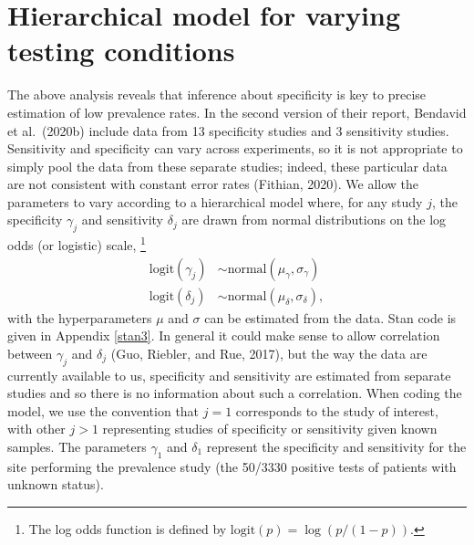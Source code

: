 \documentclass[11pt]{article}
\begin{document}
\section{Hierarchical model for varying testing conditions}\label{model2}

The above analysis reveals that inference about specificity is key to
precise estimation of low prevalence rates.  In the second version of
their report, Bendavid et al.\ (2020b) include data from 13
specificity studies and 3 sensitivity studies.  Sensitivity and
specificity can vary across experiments, so it is not appropriate to
simply pool the data from these separate studies; indeed, these
particular data are not consistent with constant error rates (Fithian,
2020). We allow the parameters to vary according to a hierarchical
model where, for any study $j$, the specificity $\gamma_j$ and
sensitivity $\delta_j$ are drawn from normal distributions on the
log odds (or logistic) scale,%
%
\footnote{The log odds function is defined by $\textrm{logit}(p) = \log(p / (1 - p)).$}
%
\begin{align*}
  \mbox{logit}(\gamma_j) & \sim \mbox{normal}(\mu_{\gamma}, \sigma_{\gamma})\\
 \mbox{logit}(\delta_j) & \sim \mbox{normal}(\mu_{\delta}, \sigma_{\delta}),
\end{align*}
%
with the hyperparameters $\mu$ and $\sigma$ can be estimated from the
data.  Stan code is given in Appendix \ref{stan3}.  In general it
could make sense to allow correlation between $\gamma_j$ and
$\delta_j$ (Guo, Riebler, and Rue, 2017), but the way the data are
currently available to us, specificity and sensitivity are estimated
from separate studies and so there is no information about such a
correlation.  When coding the model, we use the convention that $j=1$
corresponds to the study of interest, with other $j > 1$ representing
studies of specificity or sensitivity given known samples.  The
parameters $\gamma_1$ and $\delta_1$ represent the specificity and
sensitivity for the site performing the prevalence study (the 50/3330
positive tests of patients with unknown status).
\end{document}
